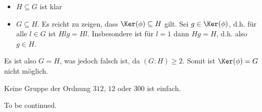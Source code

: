 \begin{uebungsblatt}
\begin{loesung}
		\begin{itemize}
			\item $H \subseteq G$ ist klar
			\item $G \subseteq H$. Es reicht zu zeigen, dass $\Ker(\phi) \subseteq H$ gilt. Sei $g \in \Ker(\phi)$, d.h. für alle $l \in G$ ist $Hlg = Hl$. Insbesondere ist für $l=1$ dann $Hg=H$, d.h. also $g \in H$.
		\end{itemize}
	Es ist also $G=H$, was jedoch falsch ist, da $(G:H) \geq 2$. Somit ist $\Ker(\phi) = G$ nicht möglich.
	\end{loesung}
	\begin{uebung}
		Keine Gruppe der Ordnung $312$, $12$ oder $300$ ist einfach.
	\end{uebung}
	\begin{loesung}
		To be continued.
	\end{loesung}
\end{uebungsblatt}